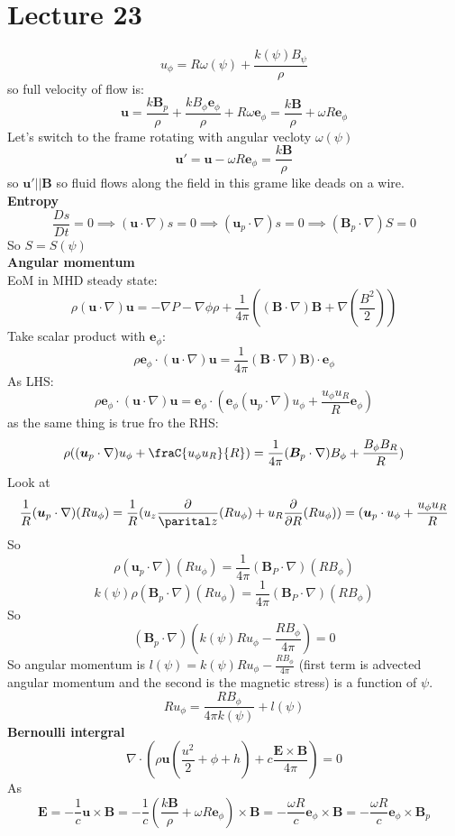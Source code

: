\documentclass{article}
\begin{document}
                \section{Lecture 23}
$$
u_{\phi} = R\omega(\psi) + \frac{k(\psi)B_{\psi}}{\rho}
$$
so full velocity of flow is:
$$
\bm u = \frac{k \bm B_p}{\rho} + \frac{k B_{\phi} \bm e_{\phi}}{\rho} + R \omega \bm e_{\phi} = \frac{k \bm B}{\rho} + \omega R \bm e_{\phi}
$$
Let's switch to the frame rotating with angular vecloty $\omega(\psi)$
$$
\bm u' = \bm u - \omega R \bm e_{\phi} = \frac{k \bm B}{\rho}
$$
so $\bm u' || \bm B$ so fluid flows along the field in this grame like deads on a wire.\\
\textbf{Entropy}
$$
\frac{Ds}{Dt}  = 0 \implies (\bm u \cdot \nabla) s = 0 \implies (\bm u_p \cdot \nabla) s = 0 \implies (\bm B_p \cdot \nabla ) S = 0
$$
So $S = S(\psi)$\\
\textbf{Angular momentum}\\
EoM in MHD steady state:
$$
\rho(\bm u \cdot \nabla) \bm u = - \nabla P - \nabla \phi \rho + \frac{1}{4\pi} ((\bm B \cdot \nabla)\bm B + \nabla(\frac{B^2}{2}) )$$
Take scalar product with $\bm e_{\phi}$:
$$
\rho \bm e_{\phi} \cdot (\bm u \cdot \nabla) \bm u  =  \frac{1}{4\pi} (\bm B \cdot \nabla)\bm B )\cdot \bm e_{\phi}
$$
As LHS: 
$$
\rho \bm e_{\phi} \cdot (\bm u \cdot \nabla) \bm u  = \bm e_{\phi} \cdot (\bm e_{\phi} (\bm u_p \cdot \nabla) u_{\phi} + \frac{u_{\phi} u_{R}}{R} \bm e_{\phi})
$$
as the same thing is true fro the RHS:
$$
\rho((\bm u_p \cdot \nabla ) u_{\phi} + \fraC{u_{\phi}u_R}{R}) = \frac{1}{4\pi}(\bm B_p \cdot \nabla) B_{\phi} + \frac{B_{\phi}B_R}{R})
$$
Look at 
$$
\frac{1}{R}(\bm u_p \cdot \nabla) (R u_{\phi}) = \frac{1}{R} (u_z\frac{\partial}{\parital z} (R u_{\phi}) + u_R \frac{\partial }{\partial R}(R u_{\phi})) = (\bm u_p \cdot u_{\phi} + \frac{u_{\phi}u_R}{R}
$$
So
$$
\rho(\bm u_p \cdot \nabla) (Ru_{\phi}) = \frac{1}{4\pi}( \bm B_P \cdot \nabla) (R B_{\phi})
$$
$$
k(\psi)\rho(\bm B_p \cdot \nabla) (Ru_{\phi}) = \frac{1}{4\pi}( \bm B_P \cdot \nabla) (R B_{\phi})
$$
So
$$
(\bm B_p \cdot \nabla) (k(\psi) R u_{\phi} - \frac{R B_{\phi}}{4 \pi}) = 0
$$
So angular momentum is $l(\psi) = k(\psi) R u_{\phi} - \frac{R B_{\phi}}{4 \pi}$ (first term is advected angular momentum and the second is the magnetic stress) is a function of $\psi$.
$$
R u_{\phi} = \frac{R B_{\phi } }{4\pi k(\psi )} + l(\psi)
$$
\textbf{Bernoulli intergral}
$$
\nabla \cdot( \rho \bm u( \frac{u^2}{2} + \phi + h) + c \frac{ \bm E \times \bm B}{4\pi}) = 0
$$
As
$$
\bm E = - \frac{1}{c} \bm u \times \bm B = - \frac{1}{c} ( \frac{k \bm B}{\rho} + \omega R \bm e_{\phi}) \times \bm B = - \frac{\omega R}{c} \bm e_{\phi} \times \bm B = - \frac{\omega R}{c} \bm e_{\phi} \times \bm B_p
$$
\end{document}
